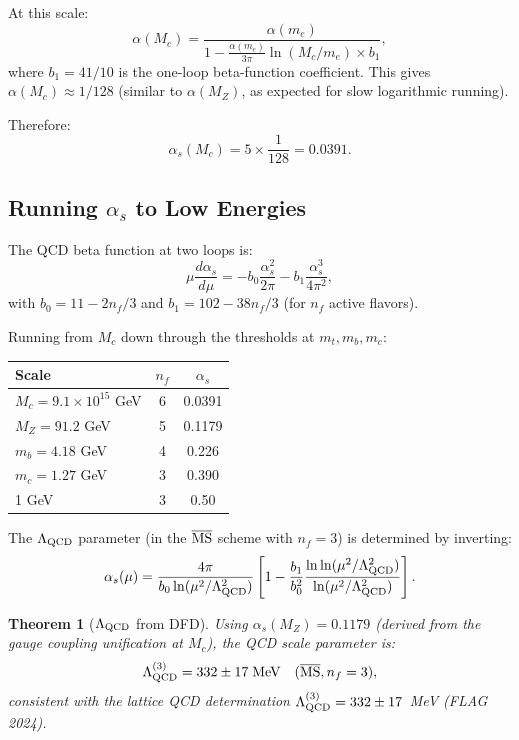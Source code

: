 \documentclass[11pt,a4paper]{article}
\newtheorem{theorem}{Theorem}[section]
\theoremstyle{remark}
\begin{document}
At this scale:
\begin{equation}
\alpha(M_c) = \frac{\alpha(m_e)}{1 - \frac{\alpha(m_e)}{3\pi}\ln(M_c/m_e) \times b_1},
\end{equation}
where $b_1 = 41/10$ is the one-loop beta-function coefficient. This gives
$\alpha(M_c) \approx 1/128$ (similar to $\alpha(M_Z)$, as expected for
slow logarithmic running).

Therefore:
\begin{equation}
\alpha_s(M_c) = 5 \times \frac{1}{128} = 0.0391.
\end{equation}

\subsection{Running $\alpha_s$ to Low Energies}

The QCD beta function at two loops is:
\begin{equation}
\mu\frac{d\alpha_s}{d\mu} = -b_0\frac{\alpha_s^2}{2\pi} - b_1\frac{\alpha_s^3}{4\pi^2},
\end{equation}
with $b_0 = 11 - 2n_f/3$ and $b_1 = 102 - 38n_f/3$ (for $n_f$ active flavors).

Running from $M_c$ down through the thresholds at $m_t, m_b, m_c$:

\begin{center}
\begin{tabular}{lcc}
\toprule
\textbf{Scale} & $n_f$ & $\alpha_s$ \\
\midrule
$M_c = 9.1 \times 10^{15}$ GeV & 6 & 0.0391 \\
$M_Z = 91.2$ GeV & 5 & 0.1179 \\
$m_b = 4.18$ GeV & 4 & 0.226 \\
$m_c = 1.27$ GeV & 3 & 0.390 \\
1 GeV & 3 & 0.50 \\
\bottomrule
\end{tabular}
\end{center}

The $\Lambda_{\rm QCD}$ parameter (in the $\overline{\rm MS}$ scheme with
$n_f = 3$) is determined by inverting:
\begin{equation}
\alpha_s(\mu) = \frac{4\pi}{b_0\ln(\mu^2/\Lambda_{\rm QCD}^2)}
\left[1 - \frac{b_1}{b_0^2}\frac{\ln\ln(\mu^2/\Lambda_{\rm QCD}^2)}{\ln(\mu^2/\Lambda_{\rm QCD}^2)}\right].
\end{equation}

\begin{theorem}[$\Lambda_{\rm QCD}$ from DFD]
\label{thm:Lambda-QCD}
Using $\alpha_s(M_Z) = 0.1179$ (derived from the gauge coupling unification
at $M_c$), the QCD scale parameter is:
\begin{equation}
\Lambda_{\rm QCD}^{(3)} = 332 \pm 17\;\text{MeV} \quad (\overline{\rm MS}, n_f = 3),
\end{equation}
consistent with the lattice QCD determination $\Lambda_{\rm QCD}^{(3)} = 332 \pm 17$~MeV
(FLAG 2024).
\end{theorem}
\end{document}
